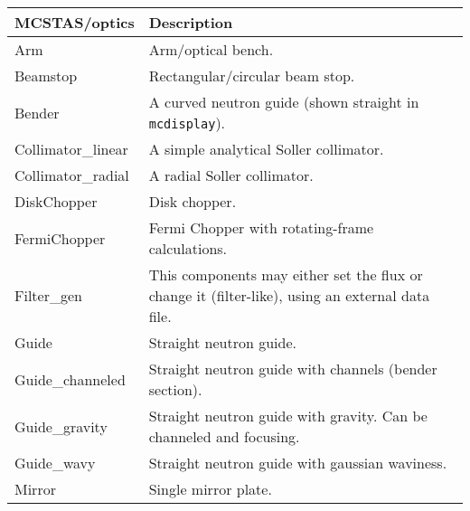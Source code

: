 \begin{table}
  \begin{center}
    {\let\my=\\
    \begin{tabular}{|p{}|p{}|}
      \hline
       \textbf{MCSTAS/optics} & Description \\
       \hline
 Arm                &  Arm/optical bench. \\
 Beamstop          &   Rectangular/circular beam stop. \\
 Bender            &  A curved neutron guide (shown straight in \verb+mcdisplay+). \\
 Collimator\_linear &  A simple analytical Soller collimator. \\
 Collimator\_radial &  A radial Soller collimator.\\
 DiskChopper           &   Disk chopper. \\
 FermiChopper      &  Fermi Chopper with rotating-frame calculations. \\
 Filter\_gen        &   This components may either set the flux
                      or change it (filter-like), using
                      an external data file. \\
 Guide             &   Straight neutron guide. \\
 Guide\_channeled   &   Straight neutron guide with
                      channels (bender section). \\
 Guide\_gravity     &  Straight neutron guide with gravity. Can be
                      channeled and focusing. \\
 Guide\_wavy        &  Straight neutron guide with gaussian waviness. \\
 Mirror             &  Single mirror plate. \\


\end{tabular}}
\end{center}
\end{table}
